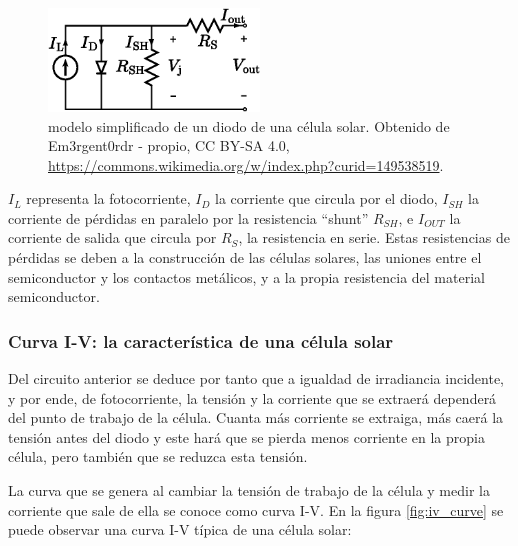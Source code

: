 \begin{figure}[H]
      \centering
      \includegraphics[width=0.5\textwidth]{./images/SoA_irrad/Solar_cell_equivalent_circuit_latex.png}
      \caption{\Gls{modelo} simplificado de un \gls{diodo} de una \gls{célula solar}. Obtenido de Em3rgent0rdr - propio, CC BY-SA 4.0, \url{https://commons.wikimedia.org/w/index.php?curid=149538519}.}
      \label{fig:solar_cell_model}
\end{figure}

$I_L$ representa la fotocorriente, $I_D$ la corriente que circula por el \gls{diodo}, $I_{SH}$ la corriente de pérdidas en paralelo por la resistencia ``\gls{shunt}'' $R_{SH}$, e $I_{OUT}$ la corriente de salida que circula por $R_{S}$, la resistencia en serie. Estas resistencias de pérdidas se deben a la construcción de las células solares, las uniones entre el \gls{semiconductor} y los contactos metálicos, y a la propia resistencia del material \gls{semiconductor}.

\subsubsection{Curva I-V: la característica de una célula solar}

Del circuito anterior se deduce por tanto que a igualdad de \gls{irradiancia} incidente, y por ende, de fotocorriente, la tensión y la corriente que se extraerá dependerá del punto de trabajo de la célula. Cuanta más corriente se extraiga, más caerá la tensión antes del \gls{diodo} y este hará que se pierda menos corriente en la propia célula, pero también que se reduzca esta tensión.

La curva que se genera al cambiar la tensión de trabajo de la célula y medir la corriente que sale de ella se conoce como \gls{curva I-V}. En la figura \ref{fig:iv_curve} se puede observar una curva I-V típica de una célula solar:

